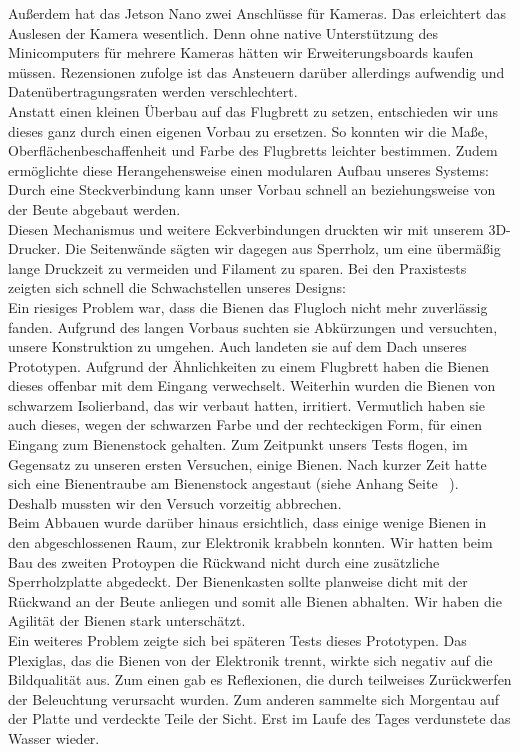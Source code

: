 \documentclass[11pt,a4paper]{article}
\begin{document}
Außerdem hat das Jetson Nano zwei Anschlüsse für Kameras. Das erleichtert das Auslesen der Kamera wesentlich. Denn ohne native Unterstützung des Minicomputers für mehrere Kameras hätten wir Erweiterungsboards kaufen müssen. Rezensionen zufolge ist das Ansteuern darüber allerdings aufwendig und Datenübertragungsraten werden verschlechtert.\\
Anstatt einen kleinen Überbau auf das Flugbrett zu setzen, entschieden wir uns dieses ganz durch einen eigenen Vorbau zu ersetzen. So konnten wir die Maße, Oberflächenbeschaffenheit und Farbe des Flugbretts leichter bestimmen. Zudem ermöglichte diese Herangehensweise einen modularen Aufbau unseres Systems: Durch eine Steckverbindung kann unser Vorbau schnell an beziehungsweise von der Beute abgebaut werden.\\
Diesen Mechanismus und weitere Eckverbindungen druckten wir mit unserem 3D-Drucker. Die Seitenwände sägten wir dagegen aus Sperrholz, um eine übermäßig lange Druckzeit zu vermeiden und Filament zu sparen.
Bei den Praxistests zeigten sich schnell die Schwachstellen unseres Designs:\\
Ein riesiges Problem war, dass die Bienen das Flugloch nicht mehr zuverlässig fanden. Aufgrund des langen Vorbaus suchten sie Abkürzungen und versuchten, unsere Konstruktion zu umgehen. Auch landeten sie auf dem Dach unseres Prototypen. Aufgrund der Ähnlichkeiten zu einem Flugbrett haben die Bienen dieses offenbar mit dem Eingang verwechselt. Weiterhin wurden die Bienen von schwarzem Isolierband, das wir verbaut hatten, irritiert. Vermutlich haben sie auch dieses, wegen der schwarzen Farbe und der rechteckigen Form, für einen Eingang zum Bienenstock gehalten. Zum Zeitpunkt unsers Tests flogen, im Gegensatz zu unseren ersten Versuchen, einige Bienen. Nach kurzer Zeit hatte sich eine Bienentraube am Bienenstock angestaut (siehe Anhang Seite \pageref*{fig:second-generation-on-hive} \, ). Deshalb mussten wir den Versuch vorzeitig abbrechen.\\
Beim Abbauen wurde darüber hinaus ersichtlich, dass einige wenige Bienen in den abgeschlossenen Raum, zur Elektronik krabbeln konnten. Wir hatten beim Bau des zweiten Protoypen die Rückwand nicht durch eine zusätzliche Sperrholzplatte abgedeckt. Der Bienenkasten sollte planweise dicht mit der Rückwand an der Beute anliegen und somit alle Bienen abhalten. Wir haben die Agilität der Bienen stark unterschätzt.\\
Ein weiteres Problem zeigte sich bei späteren Tests dieses Prototypen. Das Plexiglas, das die Bienen von der Elektronik trennt, wirkte sich negativ auf die Bildqualität aus. Zum einen gab es Reflexionen, die durch teilweises Zurückwerfen der Beleuchtung verursacht wurden. Zum anderen sammelte sich Morgentau auf der Platte und verdeckte Teile der Sicht. Erst im Laufe des Tages verdunstete das Wasser wieder.
\end{document}

